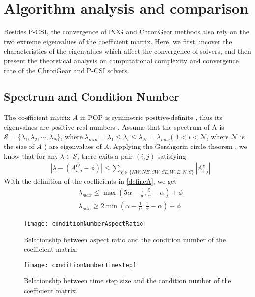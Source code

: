 \section{Algorithm analysis and comparison}\label{se:Algorithm}
Besides P-CSI, the convergence of PCG and ChronGear methods also rely on the two extreme eigenvalues of the coefficient matrix.
Here, we first uncover the characteristics of the eigenvalues which affect the convergence of solvers, and then present the theoretical analysis on computational complexity and convergence rate of the ChronGear and P-CSI solvers.

\subsection{Spectrum and Condition Number }
The coefficient matrix $A$ in POP is symmetric positive-definite \citep{smith2010parallel}, thus its eigenvalues are positive real numbers \citep{stewart1976positive}. Assume that the spectrum \citep{golub2012matrix} of A is $\mathcal{S} = \{\lambda_1, \lambda_2, \cdots, \lambda_N\}$, where  $\lambda_{min} = \lambda_1 \le \lambda_i \le \lambda_\mathcal{N} = \lambda_{max}$( $1<i <\mathcal{N}$, where $\mathcal{N}$ is the size of $A$ ) are eigenvalues of $A$.
Applying the  Gershgorin circle theorem \citep{bell1965gershgorin}, we know that for any $\lambda \in \mathcal{S}$, there exits a pair $(i,j)$ satisfying
\begin{align}
&|\lambda -  (A_{i,j}^O + \phi ) | \le \sum_{\chi \in \{NW,NE,SW,SE,W,E,N,S\}}|A_{i,j}^\chi|
\end{align}
With the definition of the coefficients in \ref{defineA}, we get
\begin{align} \label{eigsGersh}
&\lambda_{max} \le  \max (  5\alpha - \frac{1}{\alpha}, \frac{5}{\alpha}- \alpha) +\phi   \\
&\lambda_{min} \ge 2\min (  \alpha - \frac{1}{\alpha},\frac{1} {\alpha} -  \alpha) + \phi
\end{align}

\begin {figure}[!htbp]
\centering
\texttt{[image: conditionNumberAspectRatio]}
\caption[] {Relationship between aspect ratio and the condition number of the coefficient matrix.\label{fig:conditionNumberRatio}}
\end{figure}
\begin {figure}[!htbp]
\centering
\texttt{[image: conditionNumberTimestep]}
\caption[] {Relationship between time step size and the condition number of the coefficient matrix.\label{fig:conditionNumberDt}}
\end{figure}

